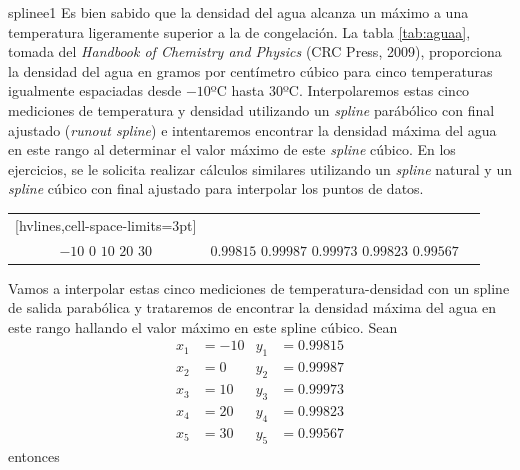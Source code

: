 \begin{examplebox}{}{splinee1}
    Es bien sabido que la densidad del agua alcanza un máximo a una temperatura ligeramente superior a la de congelación. La tabla \ref{tab:aguaa}, tomada del \emph{Handbook of Chemistry and Physics} (CRC Press, 2009), proporciona la densidad del agua en gramos por centímetro cúbico para cinco temperaturas igualmente espaciadas desde $-10$º$\mathrm{C}$ hasta $30$º$\mathrm{C}$. Interpolaremos estas cinco mediciones de temperatura y densidad utilizando un \emph{spline} parábólico con final ajustado (\emph{runout spline}) e intentaremos encontrar la densidad máxima del agua en este rango al determinar el valor máximo de este \emph{spline} cúbico. En los ejercicios, se le solicita realizar cálculos similares utilizando un \emph{spline} natural y un \emph{spline} cúbico con final ajustado para interpolar los puntos de datos.
    \begin{center}
        \begin{NiceTabular}{ccc}[hvlines,cell-space-limits=3pt]
             &  \\
             & 
        \end{NiceTabular}
         \label{tab:aguaa}
    \end{center}
    Vamos a interpolar estas cinco mediciones de temperatura-densidad con un spline de salida parabólica y trataremos de encontrar la densidad máxima del agua en este rango hallando el valor máximo en este spline cúbico. Sean
    \begin{align*}
        x_1 & = -10 & y_1 & = 0.99815 \\
        x_2 & = 0 & y_2 & = 0.99987 \\
        x_3 & = 10 & y_3 & = 0.99973 \\
        x_4 & = 20 & y_4 & = 0.99823 \\
        x_5 & = 30 & y_5 & = 0.99567
    \end{align*}
    entonces
    \begin{align*}

\end{align*}
\end{examplebox}
